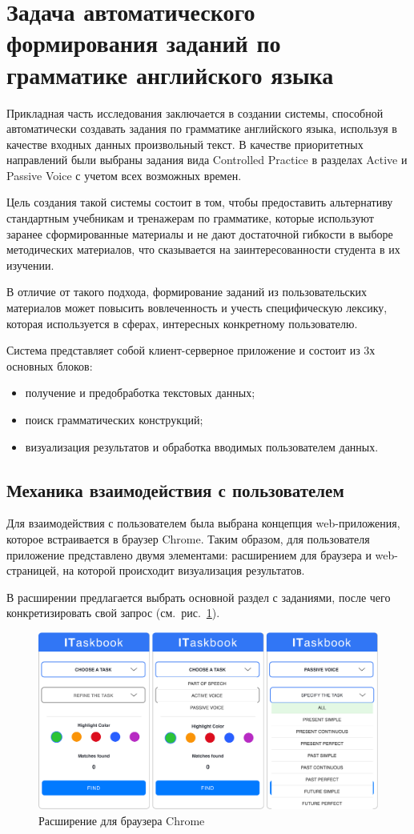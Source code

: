 \section{Задача автоматического формирования заданий по грамматике английского языка}
Прикладная часть исследования заключается в создании системы, способной автоматически создавать задания по грамматике английского языка, используя в качестве входных данных произвольный текст. В качестве приоритетных направлений были выбраны задания вида Controlled Practice в разделах Active и Passive Voice с учетом всех возможных времен. 

Цель создания такой системы состоит в том, чтобы предоставить альтернативу стандартным учебникам и тренажерам по грамматике, которые используют заранее сформированные материалы и не дают достаточной гибкости в выборе методических материалов, что сказывается на заинтересованности студента в их изучении. 

В отличие от такого подхода, формирование заданий из пользовательских материалов может повысить вовлеченность и учесть специфическую лексику, которая используется в сферах, интересных конкретному пользователю.

Система представляет собой клиент-серверное приложение и состоит из 3х основных блоков:
\begin{itemize}
  \item получение и предобработка текстовых данных;
  \item поиск грамматических конструкций;
  \item визуализация результатов и обработка вводимых пользователем данных.
\end{itemize}

\subsection{Механика взаимодействия с пользователем}
Для взаимодействия с пользователем была выбрана концепция web-приложения, которое встраивается в браузер Chrome. Таким образом, для пользователя приложение представлено двумя элементами: расширением для браузера и web-страницей, на которой происходит визуализация результатов. 

В расширении предлагается выбрать основной раздел с заданиями, после чего конкретизировать свой запрос (см.~рис.~\ref{fig:ext}). 
\begin{figure}[h]
\centering
\includegraphics[width=\textwidth]{img/ext}
\caption{\label{fig:ext}Расширение для браузера Chrome}
\end{figure}

